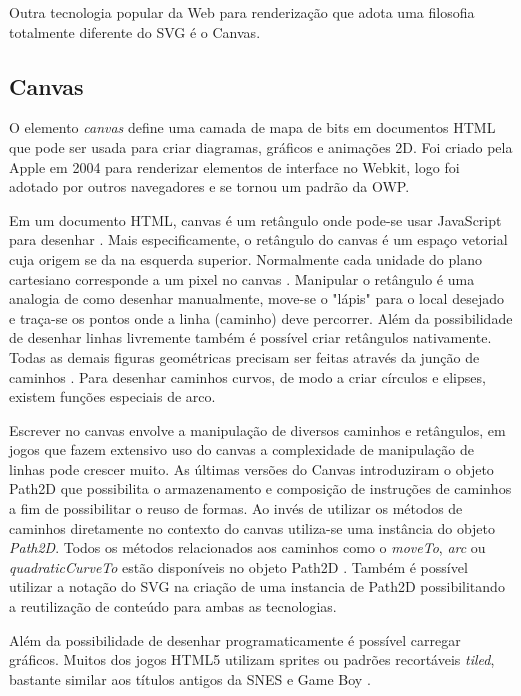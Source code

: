 Outra tecnologia popular da Web para renderização que adota uma filosofia totalmente 
diferente do SVG é o Canvas.
\subsection{Canvas}
O elemento \textit{canvas} define uma camada de mapa de bits em
documentos HTML que pode ser usada para criar diagramas, gráficos e
animações 2D. Foi criado pela Apple em 2004 para renderizar elementos
de interface no Webkit, logo foi adotado por outros navegadores e se
tornou um padrão da OWP.

Em um documento HTML, canvas é um retângulo onde pode-se usar
JavaScript para desenhar \autocite[p. 113]{diveIntohtml}. Mais
especificamente, o retângulo do canvas é um espaço vetorial cuja
origem se da na esquerda superior. Normalmente cada unidade do plano
cartesiano corresponde a um pixel no canvas \autocite{mdnCanvas}.
Manipular o retângulo é uma analogia de como desenhar manualmente,
move-se o "lápis" para o local desejado e traça-se os pontos onde
a linha (caminho) deve percorrer. Além da possibilidade de desenhar
linhas livremente também é possível criar retângulos nativamente.
Todas as demais figuras geométricas precisam ser feitas através da
junção de caminhos \autocite{mdnCanvas}. Para desenhar caminhos
curvos, de modo a criar círculos e elipses, existem funções especiais
de arco.

Escrever no canvas envolve a manipulação de diversos caminhos e
retângulos, em jogos que fazem extensivo uso do canvas a complexidade
de manipulação de linhas pode crescer muito. As últimas versões do
Canvas introduziram o objeto Path2D que possibilita o armazenamento e
composição de instruções de caminhos a fim de possibilitar o reuso
de formas. Ao invés de utilizar os métodos de caminhos diretamente no
contexto do canvas utiliza-se uma instância do objeto \textit{Path2D}.
Todos os métodos relacionados aos caminhos como o \textit{moveTo},
\textit{arc} ou \textit{quadraticCurveTo} estão disponíveis no
objeto Path2D \autocite{mdnCanvas}. Também é possível utilizar a
notação do SVG na criação de uma instancia de Path2D possibilitando
a reutilização de conteúdo para ambas as tecnologias.

Além da possibilidade de desenhar programaticamente é possível
carregar gráficos. Muitos dos jogos HTML5 utilizam sprites ou padrões
recortáveis \textit{tiled}, bastante similar aos títulos antigos da
SNES e Game Boy \autocite{buildingHtml5Game}.

